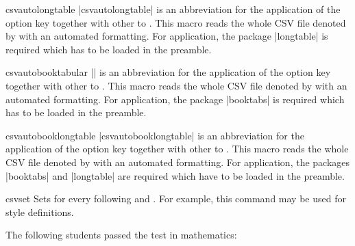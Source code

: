 \documentclass[a4paper,11pt]{ltxdoc}
\begin{document}
\begin{docCommand}{csvautolongtable}{}
  |csvautolongtable| is an abbreviation for the application of the option key
   together with other  to .
  This macro reads the whole CSV file denoted by 
  with an automated formatting.
  For application, the package |longtable| is required which has to be
  loaded in the preamble.
\begin{dispListing}
\end{dispListing}
\end{docCommand}

\clearpage

\begin{docCommand}{csvautobooktabular}{}
  |\csvautotabular| is an abbreviation for the application of the option key
   together with other  to .
  This macro reads the whole CSV file denoted by 
  with an automated formatting.
  For application, the package |booktabs| is required which has to be
  loaded in the preamble.
\begin{dispExample}
\end{dispExample}
\end{docCommand}


\begin{docCommand}{csvautobooklongtable}{}
  |csvautobooklongtable| is an abbreviation for the application of the option key
   together with other  to .
  This macro reads the whole CSV file denoted by 
  with an automated formatting.
  For application, the packages |booktabs| and |longtable| are required which have to be
  loaded in the preamble.
\begin{dispListing}
\end{dispListing}
\end{docCommand}



\clearpage

\begin{docCommand}{csvset}{}
  Sets  for every following
   and . For example, this command may
  be used for style definitions.
\begin{dispExample}

The following students passed the test in mathematics:
%
\end{dispExample}
\end{docCommand}
\end{document}
